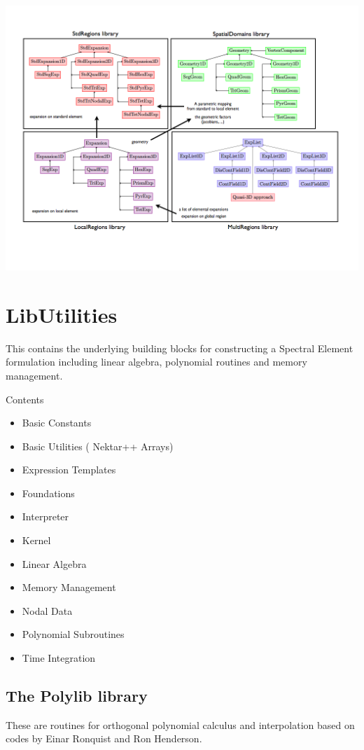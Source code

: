 \includegraphics[width=\textwidth]{img/overview.png}

\section{LibUtilities}

This contains the underlying building blocks for constructing a Spectral Element
formulation including linear algebra, polynomial routines and memory management.

Contents
\begin{itemize}
\item Basic Constants
\item Basic Utilities ( Nektar++ Arrays)
\item Expression Templates
\item Foundations
\item Interpreter
\item Kernel
\item Linear Algebra
\item Memory Management
\item Nodal Data
\item Polynomial Subroutines
\item Time Integration
\end{itemize}

\subsection{The Polylib library}
These are routines for orthogonal polynomial calculus and interpolation based on
codes by Einar Ronquist and Ron Henderson.

